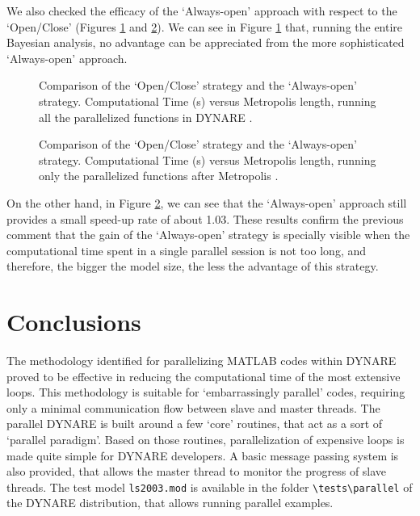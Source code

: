 \documentclass[12pt,a4paper,pdftex]{article}
\begin{document}
We also checked the efficacy of the `Always-open' approach with respect to the `Open/Close' (Figures \ref{fig:quest_complete_comp} and \ref{fig:quest_partial_comp}). We can see in Figure \ref{fig:quest_complete_comp} that, running the entire Bayesian analysis, no advantage can be appreciated from the more sophisticated `Always-open' approach.
\begin{figure}[t]
\begin{centering}
  \epsfxsize=300pt 
  \caption{Comparison of the `Open/Close' strategy and the `Always-open' strategy. Computational Time (s) versus Metropolis length, running all the parallelized functions in DYNARE \citep{Ratto_et_al_EconModel2009}.}\label{fig:quest_complete_comp}
\end{centering}
\end{figure}
\begin{figure}[!ht]
\begin{centering}
  \epsfxsize=300pt 
  \caption{Comparison of the `Open/Close' strategy and the `Always-open' strategy. Computational Time (s) versus Metropolis length, running only the parallelized functions after Metropolis \citep[QUEST III model][]{Ratto_et_al_EconModel2009}.}\label{fig:quest_partial_comp}
\end{centering}
\end{figure}

On the other hand, in Figure \ref{fig:quest_partial_comp}, we can see that the `Always-open' approach still provides a small speed-up rate of about 1.03. These results confirm the previous comment that the gain of the `Always-open' strategy is specially visible when the computational time spent in a single parallel session is not too long, and therefore, the bigger the model size, the less the advantage of this strategy.


\section{Conclusions}
The methodology identified for parallelizing MATLAB codes within DYNARE proved to be effective in reducing the computational time of the most extensive loops. This methodology is suitable for `embarrassingly parallel' codes, requiring only a minimal communication flow between slave and master threads. The parallel DYNARE is built around a few `core' routines, that act as a sort of `parallel paradigm'. Based on those routines, parallelization of expensive loops is made quite simple for DYNARE developers. A basic message passing system is also provided, that allows the master thread to monitor the progress of slave threads. The test model \verb"ls2003.mod" is available in the folder \verb"\tests\parallel" of the DYNARE distribution, that allows running parallel examples.
\end{document}
